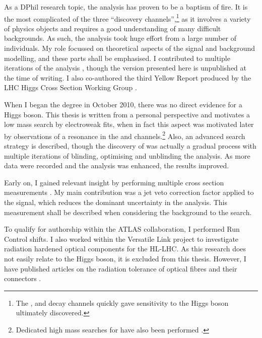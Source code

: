 
As a DPhil research topic, the \HWW analysis has proven to be a baptism of fire. It is the 
most complicated of the three ``discovery channels'',\footnote{
	The \HepProcess{\Pphoton\Pphoton}, \ZZ and \WW decay channels quickly gave sensitivity 
	to the Higgs boson ultimately discovered.
}
as it involves a variety of physics objects and requires a good understanding of many 
difficult backgrounds. As such, the analysis took huge effort from a large number of 
individuals. My role focussed on theoretical aspects of the signal and background 
modelling, and these parts shall be emphasised. I contributed to multiple iterations of 
the analysis \cite{HWW-Moriond:2012,HWW-MVA,HWW-7TeV,ATLAS-discovery,HWW-discovery-contribution,HWW-HCP,HWW-Moriond}, 
though the version presented here is unpublished at the time of writing. I also 
co-authored the third Yellow Report produced by the LHC Higgs Cross Section Working Group 
\cite{YR3}.

When I began the degree in October 2010, there was no direct evidence for a Higgs boson. 
This thesis is written from a personal perspective and motivates a low mass search by 
electroweak fits, when in fact this aspect was motivated later by observations of a 
resonance in the \HepProcess{\Pphoton\Pphoton} and \ZZ channels.\footnote{
	Dedicated high mass searches for \HWW have also been performed \cite{HWW-highmass}.
}
Also, an advanced search strategy is described, though the discovery of \HWW was actually 
a gradual process with multiple iterations of blinding, optimising and unblinding the 
analysis. As more data were recorded and the analysis was enhanced, the results improved.

Early on, I gained relevant insight by performing multiple \WW cross section measurements 
\cite{WW-35ipb,WW-EPS,WW-1ifb,WW-HCP,WW-7TeV}. My main contribution was a jet veto 
correction factor applied to the \WW signal, which reduces the dominant uncertainty in the 
analysis. This measurement shall be described when considering the \WW background to the 
\HWW search.

To qualify for authorship within the ATLAS collaboration, I performed Run Control shifts. 
I also worked within the Versatile Link project \cite{VersatileLink} to investigate 
radiation hardened optical components for the HL-LHC. As this research does not easily 
relate to the Higgs boson, it is excluded from this thesis. However, I have published 
articles on the radiation tolerance of optical fibres \cite{VersatileLinkFibres} and their 
connectors \cite{VersatileLinkConnectors}.
